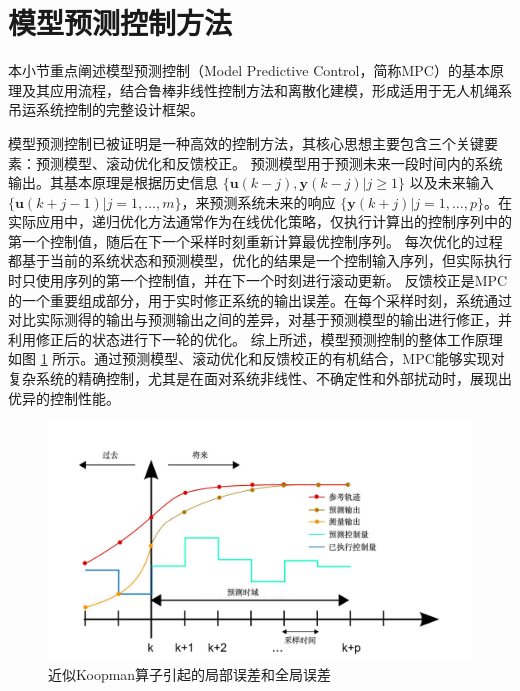 \documentclass[lang=chs, degree=master, blindreview=true, winfonts=true]{yanputhesis}
\begin{document}



\section{模型预测控制方法}
本小节重点阐述模型预测控制（Model Predictive Control，简称MPC）的基本原理及其应用流程，结合鲁棒非线性控制方法和离散化建模，形成适用于无人机绳系吊运系统控制的完整设计框架。

模型预测控制已被证明是一种高效的控制方法\cite{2003A}，其核心思想主要包含三个关键要素：预测模型、滚动优化和反馈校正。
预测模型用于预测未来一段时间内的系统输出。其基本原理是根据历史信息 $\{ \bm u(k-j), \bm y(k-j) | j \geq 1 \}$ 以及未来输入 $\{ \bm u(k+j-1) | j = 1, \dots, m \}$，来预测系统未来的响应 $\{ \bm y(k+j) | j = 1, \dots, p \}$。在实际应用中，递归优化方法通常作为在线优化策略，仅执行计算出的控制序列中的第一个控制值，随后在下一个采样时刻重新计算最优控制序列。
每次优化的过程都基于当前的系统状态和预测模型，优化的结果是一个控制输入序列，但实际执行时只使用序列的第一个控制值，并在下一个时刻进行滚动更新。
反馈校正是MPC的一个重要组成部分，用于实时修正系统的输出误差。在每个采样时刻，系统通过对比实际测得的输出与预测输出之间的差异，对基于预测模型的输出进行修正，并利用修正后的状态进行下一轮的优化。
综上所述，模型预测控制的整体工作原理如图 \ref{mpc} 所示。通过预测模型、滚动优化和反馈校正的有机结合，MPC能够实现对复杂系统的精确控制，尤其是在面对系统非线性、不确定性和外部扰动时，展现出优异的控制性能。

\begin{figure}[hbt!]
	\centering
	\includegraphics[width=40pc]{picture/mpc.jpg} 
	\caption{近似Koopman算子引起的局部误差和全局误差} \label{mpc}
\end{figure}
\end{document}
